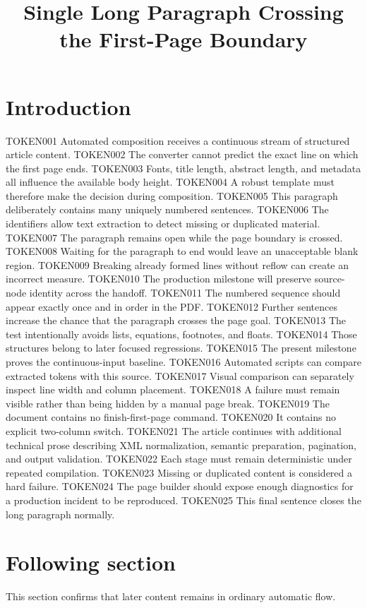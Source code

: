 \documentclass{tnqjournal}
\title{Single Long Paragraph Crossing the First-Page Boundary}
\begin{document}
\maketitle
\section{Introduction}
TOKEN001 Automated composition receives a continuous stream of structured article content. TOKEN002 The converter cannot predict the exact line on which the first page ends. TOKEN003 Fonts, title length, abstract length, and metadata all influence the available body height. TOKEN004 A robust template must therefore make the decision during composition. TOKEN005 This paragraph deliberately contains many uniquely numbered sentences. TOKEN006 The identifiers allow text extraction to detect missing or duplicated material. TOKEN007 The paragraph remains open while the page boundary is crossed. TOKEN008 Waiting for the paragraph to end would leave an unacceptable blank region. TOKEN009 Breaking already formed lines without reflow can create an incorrect measure. TOKEN010 The production milestone will preserve source-node identity across the handoff. TOKEN011 The numbered sequence should appear exactly once and in order in the PDF. TOKEN012 Further sentences increase the chance that the paragraph crosses the page goal. TOKEN013 The test intentionally avoids lists, equations, footnotes, and floats. TOKEN014 Those structures belong to later focused regressions. TOKEN015 The present milestone proves the continuous-input baseline. TOKEN016 Automated scripts can compare extracted tokens with this source. TOKEN017 Visual comparison can separately inspect line width and column placement. TOKEN018 A failure must remain visible rather than being hidden by a manual page break. TOKEN019 The document contains no finish-first-page command. TOKEN020 It contains no explicit two-column switch. TOKEN021 The article continues with additional technical prose describing XML normalization, semantic preparation, pagination, and output validation. TOKEN022 Each stage must remain deterministic under repeated compilation. TOKEN023 Missing or duplicated content is considered a hard failure. TOKEN024 The page builder should expose enough diagnostics for a production incident to be reproduced. TOKEN025 This final sentence closes the long paragraph normally.
\section{Following section}
This section confirms that later content remains in ordinary automatic flow.
\end{document}
